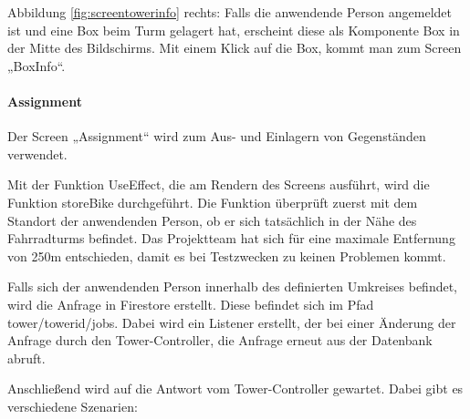 \noindent Abbildung \ref{fig:screentowerinfo} rechts: Falls die anwendende Person angemeldet ist und eine Box beim Turm gelagert hat, erscheint diese als Komponente Box in der Mitte des Bildschirms. Mit einem Klick auf die Box, kommt man zum Screen „BoxInfo“.

\bigskip


\paragraph{Assignment}Der Screen „Assignment“ wird zum Aus- und Einlagern von Gegenständen verwendet.

\noindent Mit der Funktion UseEffect, die am Rendern des Screens ausführt, wird die Funktion storeBike durchgeführt. Die Funktion überprüft zuerst mit dem Standort der anwendenden Person, ob er sich tatsächlich in der Nähe des Fahrradturms befindet. Das Projektteam hat sich für eine maximale Entfernung von 250m entschieden, damit es bei Testzwecken zu keinen Problemen kommt.

\noindent Falls sich der anwendenden Person innerhalb des definierten Umkreises befindet, wird die Anfrage in Firestore erstellt. Diese befindet sich im Pfad tower/towerid/jobs. Dabei wird ein Listener erstellt, der bei einer Änderung der Anfrage durch den Tower-Controller, die Anfrage erneut aus der Datenbank abruft.

\noindent Anschließend wird auf die Antwort vom Tower-Controller gewartet. Dabei gibt es verschiedene Szenarien:

